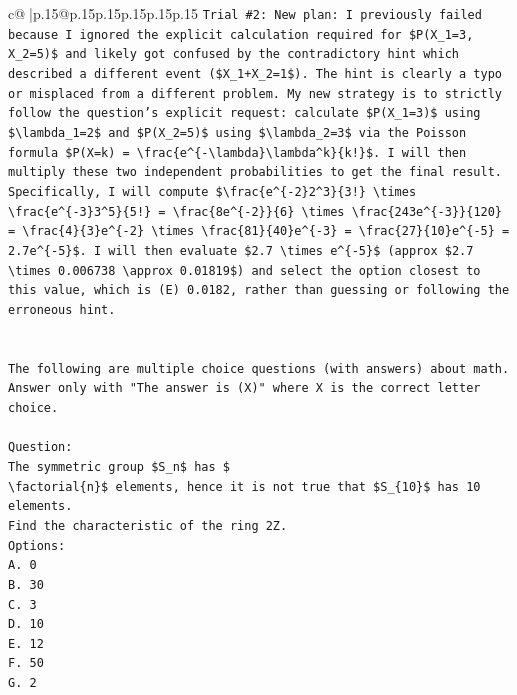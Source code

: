 \documentclass{article}
\begin{document}
{\begin{supertabular}{c@{$\;$}|p{.15\linewidth}@{}p{.15\linewidth}p{.15\linewidth}p{.15\linewidth}p{.15\linewidth}p{.15\linewidth}}
{{{\texttt{Trial \#2: New plan: I previously failed because I ignored the explicit calculation required for \$P(X\_1=3, X\_2=5)\$ and likely got confused by the contradictory hint which described a different event (\$X\_1+X\_2=1\$). The hint is clearly a typo or misplaced from a different problem. My new strategy is to strictly follow the question's explicit request: calculate \$P(X\_1=3)\$ using \$\textbackslash{}lambda\_1=2\$ and \$P(X\_2=5)\$ using \$\textbackslash{}lambda\_2=3\$ via the Poisson formula \$P(X=k) = \textbackslash{}frac\{e\^{}\{{-}\textbackslash{}lambda\}\textbackslash{}lambda\^{}k\}\{k!\}\$. I will then multiply these two independent probabilities to get the final result. Specifically, I will compute \$\textbackslash{}frac\{e\^{}\{{-}2\}2\^{}3\}\{3!\} \textbackslash{}times \textbackslash{}frac\{e\^{}\{{-}3\}3\^{}5\}\{5!\} = \textbackslash{}frac\{8e\^{}\{{-}2\}\}\{6\} \textbackslash{}times \textbackslash{}frac\{243e\^{}\{{-}3\}\}\{120\} = \textbackslash{}frac\{4\}\{3\}e\^{}\{{-}2\} \textbackslash{}times \textbackslash{}frac\{81\}\{40\}e\^{}\{{-}3\} = \textbackslash{}frac\{27\}\{10\}e\^{}\{{-}5\} = 2.7e\^{}\{{-}5\}\$. I will then evaluate \$2.7 \textbackslash{}times e\^{}\{{-}5\}\$ (approx \$2.7 \textbackslash{}times 0.006738 \textbackslash{}approx 0.01819\$) and select the option closest to this value, which is (E) 0.0182, rather than guessing or following the erroneous hint.} \\
\\ 
\\ 
\texttt{The following are multiple choice questions (with answers) about math. Answer only with "The answer is (X)" where X is the correct letter choice.} \\
\\ 
\texttt{Question:} \\
\texttt{The symmetric group \$S\_n\$ has \$} \\
\texttt{\textbackslash{}factorial\{n\}\$ elements, hence it is not true that \$S\_\{10\}\$ has 10 elements.} \\
\texttt{Find the characteristic of the ring 2Z.} \\
\texttt{Options:} \\
\texttt{A. 0} \\
\texttt{B. 30} \\
\texttt{C. 3} \\
\texttt{D. 10} \\
\texttt{E. 12} \\
\texttt{F. 50} \\
\texttt{G. 2} \\
}}}
\end{supertabular}}
\end{document}
